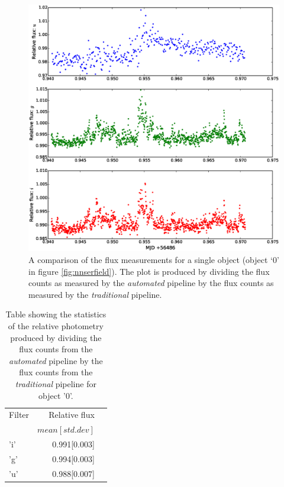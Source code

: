 \begin{figure}[!h]
\centering
\includegraphics[width=140mm]{images/compare_photometry.eps}
\caption{A comparison of the flux measurements for a single object (object `0' in figure \ref{fig:nnserfield}). The plot is produced by dividing the flux counts as measured by the \emph{automated} pipeline by the flux counts as measured by the \emph{traditional} pipeline.}
\label{fig:comparephotometry}
\end{figure}

\begin{table}
  \label{tab:differential}
  \centering
  \begin{tabular}{|l|r|r|}
    \hline
    Filter & Relative flux  \\
           &  $mean[std. dev]$ \\
    \hline
    'i'    & 0.991[0.003] \\
    'g'    & 0.994[0.003] \\
    'u'    & 0.988[0.007] \\
    \hline
   \end{tabular}
  \caption{Table showing the statistics of the relative photometry produced by dividing the flux counts from the \emph{automated} pipeline by the flux counts from the \emph{traditional} pipeline for object '0'.}
\end{table}

